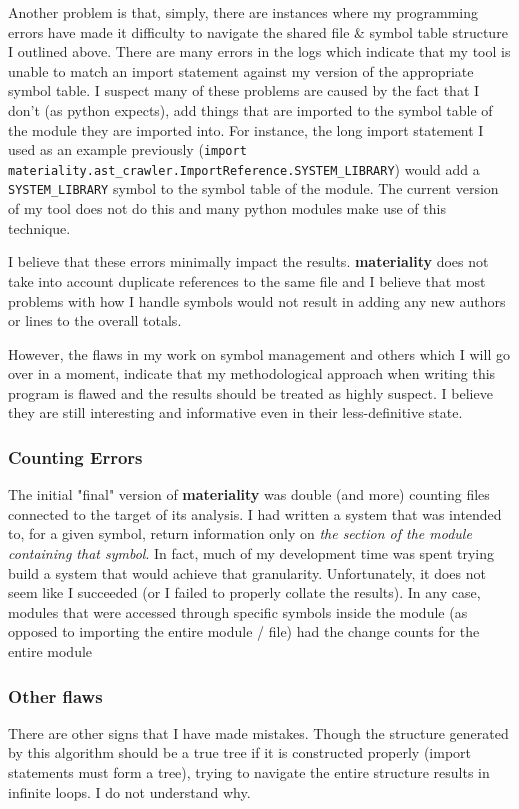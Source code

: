 \documentclass[a4paper,man,natbib,floatsintext]{apa6}
\begin{document}
  Another problem is that, simply, there are instances where my programming errors have made it difficulty to navigate the shared file \& symbol table structure I outlined above. There are many errors in the logs which indicate that my tool is unable to match an import statement against my version of the appropriate symbol table. I suspect many of these problems are caused by the fact that I don't (as \Gls{python} expects), add things that are imported to the symbol table of the module they are imported into. For instance, the long import statement I used as an example previously (\verb|import materiality.ast_crawler.ImportReference.SYSTEM_LIBRARY|) would add a \verb|SYSTEM_LIBRARY| symbol to the symbol table of the module. The current version of my tool does not do this and many \Gls{python} modules make use of this technique.

  I believe that these errors minimally impact the results. \textbf{materiality} does not take into account duplicate references to the same file and I believe that most problems with how I handle symbols would not result in adding any new authors or lines to the overall totals. 

  However, the flaws in my work on symbol management and others which I will go over in a moment, indicate that my methodological approach when writing this program is flawed and the results should be treated as highly suspect. I believe they are still interesting and informative even in their less-definitive state. 

  \subsubsection{Counting Errors}
  The initial "final" version of \textbf{materiality} was double (and more) counting files connected to the target of its analysis. I had written a system that was intended to, for a given symbol, return information only on \textit{the section of the module containing that symbol}. In fact, much of my development time was spent trying build a system that would achieve that granularity. Unfortunately, it does not seem like I succeeded (or I failed to properly collate the results). In any case, modules that were accessed through specific symbols inside the module (as opposed to importing the entire module / file) had the change counts for the entire module

  \subsubsection{Other flaws}
  There are other signs that I have made mistakes. Though the structure generated by this algorithm should be a true tree if it is constructed properly (import statements must form a tree), trying to navigate the entire structure results in infinite loops. I do not understand why. 
\end{document}
